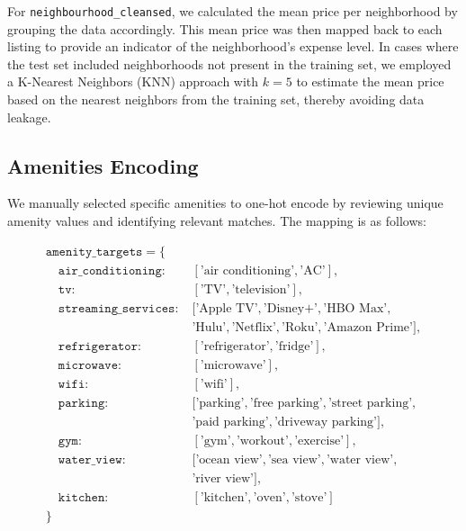 \documentclass[12pt]{article}
\begin{document}
For \texttt{neighbourhood\_cleansed}, we calculated the mean price per neighborhood by grouping the data accordingly. This mean price was then mapped back to each listing to provide an indicator of the neighborhood's expense level. In cases where the test set included neighborhoods not present in the training set, we employed a K-Nearest Neighbors (KNN) approach with $k=5$ to estimate the mean price based on the nearest neighbors from the training set, thereby avoiding data leakage.

\subsection{Amenities Encoding}

We manually selected specific amenities to one-hot encode by reviewing unique amenity values and identifying relevant matches. The mapping is as follows:

\[
\begin{aligned}
\texttt{amenity\_targets} = \{ \\
\quad \texttt{air\_conditioning}: \; & [\text{'air conditioning'}, \text{'AC'}], \\
\quad \texttt{tv}: \; & [\text{'TV'}, \text{'television'}], \\
\quad \texttt{streaming\_services}: \; & [
    \text{'Apple TV'}, \text{'Disney+'}, \text{'HBO Max'}, \\
\quad \quad & \text{'Hulu'}, \text{'Netflix'}, \text{'Roku'}, \text{'Amazon Prime'}
], \\
\quad \texttt{refrigerator}: \; & [\text{'refrigerator'}, \text{'fridge'}], \\
\quad \texttt{microwave}: \; & [\text{'microwave'}], \\
\quad \texttt{wifi}: \; & [\text{'wifi'}], \\
\quad \texttt{parking}: \; & [
    \text{'parking'}, \text{'free parking'}, \text{'street parking'}, \\
\quad \quad & \text{'paid parking'}, \text{'driveway parking'}
], \\
\quad \texttt{gym}: \; & [\text{'gym'}, \text{'workout'}, \text{'exercise'}], \\
\quad \texttt{water\_view}: \; & [
    \text{'ocean view'}, \text{'sea view'}, \text{'water view'}, \\
\quad \quad & \text{'river view'}
], \\
\quad \texttt{kitchen}: \; & [\text{'kitchen'}, \text{'oven'}, \text{'stove'}] \\
\}
\end{aligned}
\]
\end{document}
